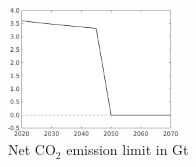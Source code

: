 % 


%			

\begin{figure}
	\caption{Net CO$_2$ emission limit in Gt}\label{fig:emlimit}
	\includegraphics[width=0.4\textwidth]{../../codding_model/own_basedOnFried/optimalPol_010922_revision/figures/all_13Sept22_Tplus30/Emnet.png}
\end{figure}

